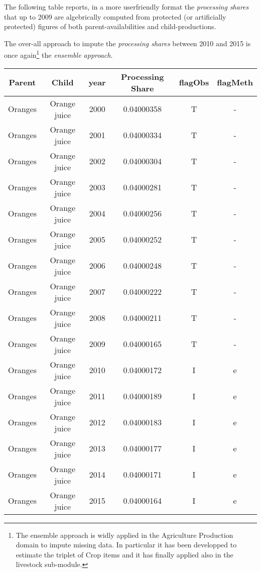 \documentclass[nojss]{jss}
\begin{document}
  The following table reports, in a more userfriendly format the \textit{processing shares} that up to 2009 are algebrically computed from protected (or artificially protected) figures of both parent-availabilities and child-productions.
 
 The over-all approach to impute the \textit{processing shares} between 2010 and 2015 is once again\footnote{The ensemble approach is widly applied in the Agriculture Production domain to impute missing data. In particular it has been developped to estimate the triplet of Crop items and it has finally applied also in the livestock sub-module.} the \textit{ensemble approach}.
 
\begin{tabular}{cccccc}
  \hline
  Parent&Child&year&Processing Share& flagObs & flagMeth \\
  \hline
  Oranges& Orange juice     &   2000   &      0.04000358  & T & - \\  
  Oranges& Orange juice     &   2001   &     0.04000334   & T & - \\  
  Oranges& Orange juice     &   2002   &     0.04000304   & T & - \\  
  Oranges& Orange juice     &   2003   &      0.04000281  & T & - \\  
  Oranges& Orange juice     &   2004   &     0.04000256   & T & - \\  
  Oranges& Orange juice     &   2005   &      0.04000252  & T & - \\  
  Oranges& Orange juice     &   2006   &      0.04000248  & T & - \\  
  Oranges& Orange juice     &   2007   &     0.04000222   & T & - \\  
  Oranges& Orange juice     &   2008   &      0.04000211  & T & - \\  
  Oranges& Orange juice     &   2009   &      0.04000165  & T & - \\  
  Oranges& Orange juice     &   2010   &     0.04000172   & I & e \\  
  Oranges& Orange juice     &   2011   &     0.04000189   & I & e \\  
  Oranges& Orange juice     &   2012   &     0.04000183   & I & e \\  
  Oranges& Orange juice     &   2013   &     0.04000177   & I & e \\  
  Oranges& Orange juice     &   2014   &      0.04000171  & I & e \\  
  Oranges& Orange juice     &   2015   &      0.04000164  & I & e \\  
  \hline
  \end{tabular}
  
\end{document}
